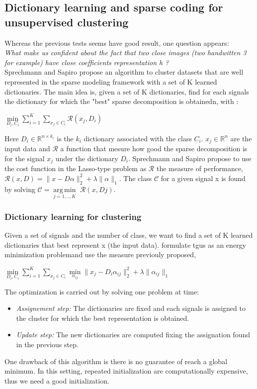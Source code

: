 \documentclass[a4paper,10pt]{article}
\newcommand{\R}{\mathbb{R}}
\DeclareMathOperator*{\argmin}{arg\,min}
\begin{document}
\subsection{Dictionary learning and sparse coding for unsupervised clustering}
\label{sec:Clustering}
Whereas the previous tests seems have good result, one question appears: \\ \textit{What make us confident about the fact that  two close images (two handwitten 3 for example) have close coefficients representation h ?}\\
Sprechmann and Sapiro \cite{5494985} propose an algorithm to cluster datasets that are well represented in the sparse modeling framework with a set of K learned dictionaries. The main idea is, given a set of K dictionaries, find for each signals the dictionary for which the "best" sparse decomposition is obtainedn, with :

\begin{center}
$\underset{D_i,C_i}{\min} \sum_{i=1}^{K} \sum_{x_j \in C_i} \mathcal{R}(x_j, D_i)$
 
\end{center}
Here $D_i \in \R^{n \times k_i}$ is the $k_i$ dictionary associated with the class $C_i$. $x_j \in \R^n$ are the input data and $\mathcal{R}$  a function that mesure how good the sparse decomposition is for the signal $x_j$ under the dictionary $D_i$. Sprechmann and Sapiro propose to use the cost function in the Lasso-type problem as $\mathcal{R}$ the measure of performance, $\mathcal{R}(x,D) = \|x - D\alpha\|^2_2 + \lambda \|\alpha\|_1$. The class $\mathcal{C}$ for a given signal x is found by solving $\mathcal{C}= \underset{j=1,..,K}{\argmin}$ $ \mathcal{R}(x,Dj) $.

\subsubsection{Dictionary learning for clustering}
Given a set of signals and the number of class, we want to find a set of K learned dictionaries that best represent x (the input data). \cite{5494985} formulate tgus as an energy minimization problemand use the measure previouly proposed,\\
\begin{center}
 $\underset{D_i,C_i}{\min} \sum_{i=1}^{K} \sum_{x_j \in C_i} \underset{\alpha_{ij}}{\min}\|x_j - D_i \alpha_{ij}\|^2_2 + \lambda\|\alpha_{ij}\|_1$
\end{center}
The optimization is carried out by solving one problem at time:
\begin{itemize}
 \item \textit{Assignement step:} The dictionaries are fixed and each signals is assigned to the cluster for which the best representation is obtained.
 \item \textit{Update step:} The new dictionaries are computed fixing the assignation found in the previous step.
\end{itemize}
One drawback of this algorithm is there is no guarantee of reach a global minimum. In this setting, repeated initialization are computationally expensive, thus we need a good initialization.
\end{document}
